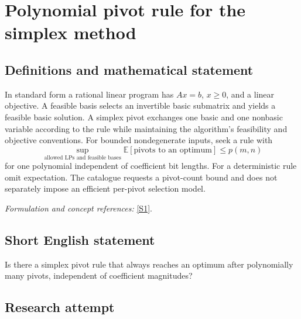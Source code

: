 \documentclass[11pt,a4paper]{article}
\newcommand{\sref}[2]{\hyperlink{source:#1:#2}{[S#2]}}
\newif\ifshowcatalogue
\newcommand{\cataloguescope}[1]{\ifshowcatalogue
 \paragraph{Exact scope in the supplied catalogue.}
 \begin{quote}\small #1\end{quote}\fi}
\numberwithin{equation}{section}
\begin{document}
\setcounter{section}{0}
\clearpage
\section*{\texorpdfstring{Polynomial pivot rule for the simplex method}{Polynomial pivot rule for the simplex method}}\label{30006742}
\subsection{Definitions and mathematical statement}
In standard form a rational linear program has $Ax=b$, $x\ge0$, and a linear objective. A feasible basis selects an invertible basic submatrix and yields a feasible basic solution. A simplex pivot exchanges one basic and one nonbasic variable according to the rule while maintaining the algorithm's feasibility and objective conventions. For bounded nondegenerate inputs, seek a rule with
\[
 \sup_{\text{allowed LPs and feasible bases}}\mathbb E[\text{pivots to an optimum}]
 \le p(m,n)
\]
for one polynomial independent of coefficient bit lengths. For a deterministic rule omit expectation. The catalogue requests a pivot-count bound and does not separately impose an efficient per-pivot selection model.
\par\smallskip\textit{Formulation and concept references:} \sref{30006742}{1}.
\cataloguescope{Construct a deterministic or randomized simplex pivot rule and a polynomial p such that, for every bounded nondegenerate rational linear program with m equality constraints and n variables and every feasible starting basis, the rule reaches an optimal basis in at most p(m,n) pivots, in expectation when the rule is randomized; or prove that no such rule exists.}
\subsection{Short English statement}
Is there a simplex pivot rule that always reaches an optimum after polynomially many pivots, independent of coefficient magnitudes?
\subsection{Research attempt}
\end{document}
